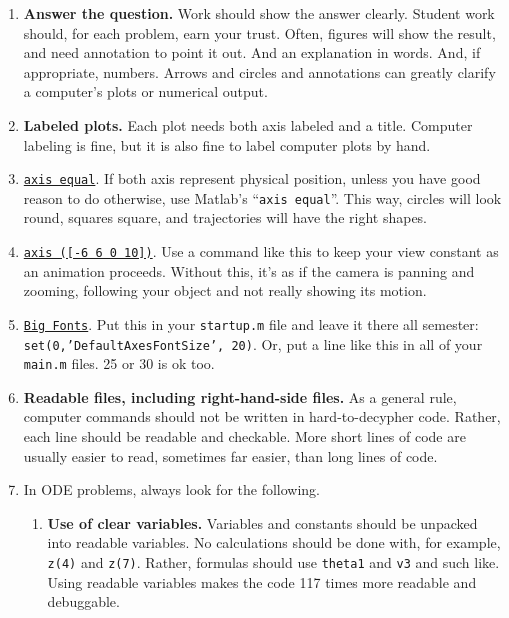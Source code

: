 \documentclass[11pt]{article}
\begin{document}
\begin{enumerate}
\begin{enumerate}
\begin{enumerate}
Use figures and numerical values to show these consistencies between the numerical solution and things that are known or suspected to be true. 

\item  \textbf{Answer the question.} Work should show the answer clearly.  Student work should, for each problem, earn your trust.  Often,  figures will  show the result, and need annotation to point it out.  And an explanation in words.  And, if appropriate, numbers. Arrows and circles and annotations can greatly clarify a computer's plots or numerical output.

\item  \textbf{Labeled plots. } Each plot needs both axis labeled and a title. Computer labeling is fine, but it is also fine to label computer plots by hand.

\item  \underline{\tt axis equal}. If both axis represent physical position, unless you have good reason to do otherwise, use  Matlab's ``{\tt axis equal}''.  This way, circles will look round, squares square, and trajectories will have the right shapes.

\item \underline{\tt axis ([-6 6 0 10])}.  Use a command like this to keep your view constant as an animation proceeds. Without this,  it's as if the camera is panning and zooming, following your object and not really showing its motion.

\item \underline{\tt Big Fonts}. Put this in your {\tt startup.m} file and leave it there all semester: {\tt set(0,'DefaultAxesFontSize', 20)}. Or, put a line like this in all of your
{\tt main.m} files. 25 or 30 is ok too. 


\item  \textbf{Readable files, including right-hand-side files.}
As a general rule,  computer commands should not be written in hard-to-decypher code.  Rather, each line should be readable and checkable.  More short lines of code are usually easier to read, sometimes far easier,  than long lines of code.

\item In ODE problems, always look for the following.

\begin{enumerate}
\item  \textbf{Use  of clear variables. } Variables and constants  should be unpacked into readable variables. No calculations should be done with, for example, {\tt  z(4)} and {\tt  z(7)}. Rather, formulas should use {\tt  theta1} and {\tt  v3} and such like.  Using readable variables makes the code 117 times more readable and debuggable.


\end{enumerate}
\end{enumerate}
\end{enumerate}
\end{enumerate}
\end{document}
